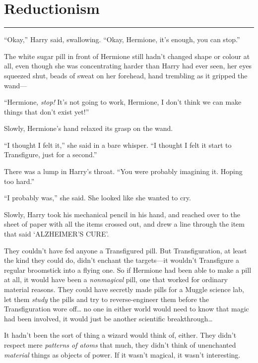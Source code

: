 \chapter{Reductionism}\label{reductionism}

\begin{center}\rule{3in}{0.4pt}\end{center}

``Okay,'' Harry said, swallowing. ``Okay, Hermione, it's enough, you can
stop.''

The white sugar pill in front of Hermione still hadn't changed shape or
colour at all, even though she was concentrating harder than Harry had
ever seen, her eyes squeezed shut, beads of sweat on her forehead, hand
trembling as it gripped the wand---

``Hermione, \emph{stop!} It's not going to work, Hermione, I don't think
we can make things that don't exist yet!''

Slowly, Hermione's hand relaxed its grasp on the wand.

``I thought I felt it,'' she said in a bare whisper. ``I thought I felt
it start to Transfigure, just for a second.''

There was a lump in Harry's throat. ``You were probably imagining it.
Hoping too hard.''

``I probably was,'' she said. She looked like she wanted to cry.

Slowly, Harry took his mechanical pencil in his hand, and reached over
to the sheet of paper with all the items crossed out, and drew a line
through the item that said `ALZHEIMER'S CURE'.

They couldn't have fed anyone a Transfigured pill. But Transfiguration,
at least the kind they could do, didn't enchant the targets---it
wouldn't Transfigure a regular broomstick into a flying one. So if
Hermione had been able to make a pill at all, it would have been a
\emph{nonmagical} pill, one that worked for ordinary material reasons.
They could have secretly made pills for a Muggle science lab, let them
\emph{study} the pills and try to reverse-engineer them before the
Transfiguration wore off\ldots{} no one in either world would need to
know that magic had been involved, it would just be another scientific
breakthrough\ldots{}

It hadn't been the sort of thing a wizard would think of, either. They
didn't respect mere \emph{patterns of atoms} that much, they didn't
think of unenchanted \emph{material} things as objects of power. If it
wasn't magical, it wasn't interesting.

